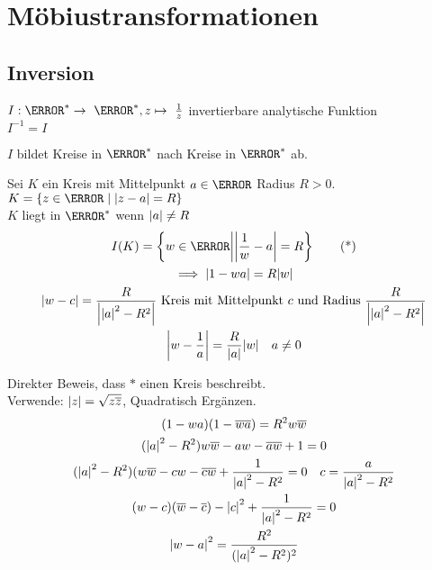 \section{Möbiustransformationen}
\subsection{Inversion}
$I : \C^* \rightarrow \C^* , z \mapsto \frac{1}{z}$ invertierbare analytische Funktion \\
$I^{-1} = I$ \\
\begin{beh}
	$I$ bildet Kreise in $\C^*$ nach Kreise in $\C^*$ ab. \\
	\begin{bew}
		Sei $K$ ein Kreis mit Mittelpunkt $a \in \C$ Radius $R > 0$. $K = \{ z \in \C \mid \abs{z-a} = R \}$ \\
		$K$ liegt in $\C^*$ wenn $\abs{a} \neq R$
		\begin{gather*}
			I(K) = \left\{ w \in \C \middle| \abs{\frac{1}{w} - a} = R \right\} \tag{*} \\
			\implies \abs{1-wa} = R \abs{w} \\
			\abs{w-c} = \frac{R}{\abs{\abs{a}^2-R^2}} \text{ Kreis mit Mittelpunkt $c$ und Radius } \frac{R}{\abs{\abs{a}^2-R^2}} \\
			\abs{w - \frac{1}{a}} = \frac{R}{\abs{a}} \abs{w} \quad a \neq 0
		\end{gather*}
		\begin{bew}
			Direkter Beweis, dass $*$ einen Kreis beschreibt. \\
			Verwende: $\abs{z} = \sqrt{z\overline{z}}$, Quadratisch Ergänzen. \\
			\begin{gather*}
				(1-wa)(1-\overline{w}\overline{a}) = R^2 w \overline{w} \\
				(\abs{a}^2 - R^2) w \overline{w} - aw - \overline{a}\overline{w} + 1 = 0 \\
				(\abs{a}^2 - R^2)( w \overline{w} - cw - \overline{c}\overline{w} + \frac{1}{\abs{a}^2 - R^2} = 0 \quad c = \frac{a}{\abs{a}^2 - R^2} \\
				(w-c)(\overline{w}-\overline{c}) - \abs{c}^2 + \frac{1}{\abs{a}^2 - R^2} = 0 \\
				\abs{w-a}^2 = \frac{R^2}{(\abs{a}^2 - R^2)^2}
			\end{gather*}
		\end{bew}
	\end{bew}
\end{beh}

